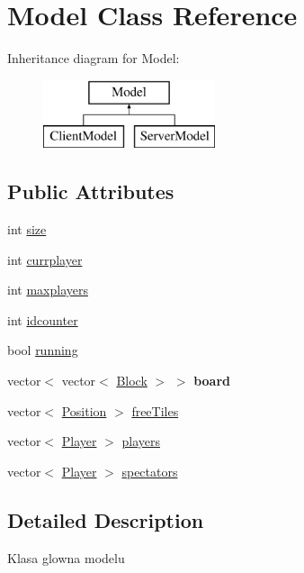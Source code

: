 \hypertarget{classModel}{\section{Model Class Reference}
\label{classModel}
}
Inheritance diagram for Model\-:\begin{figure}[H]
\begin{center}
\leavevmode
\includegraphics[height=2.000000cm]{classModel}
\end{center}
\end{figure}
\subsection*{Public Attributes}
\begin{DoxyCompactItemize}
\item 
int \hyperlink{classModel_a944736812928acb65055f5c7229970ae}{size}
\item 
int \hyperlink{classModel_a882710d0512c34c6b9b385c8d76825cb}{currplayer}
\item 
int \hyperlink{classModel_aa90bb7e95e18111d59df116fcabbdd89}{maxplayers}
\item 
int \hyperlink{classModel_addac0dda85cc75450345d300c48ff276}{idcounter}
\item 
bool \hyperlink{classModel_a46db7d7d8e79bf0bebd19c3e0122fba0}{running}
\item 
\hypertarget{classModel_a9e938f44d01e9e872152b1cad3f81646}{vector$<$ vector$<$ \hyperlink{classBlock}{Block} $>$ $>$ {\bfseries board}}\label{classModel_a9e938f44d01e9e872152b1cad3f81646}

\item 
vector$<$ \hyperlink{classPosition}{Position} $>$ \hyperlink{classModel_a082090abc6b22e3bb5354f892417c444}{free\-Tiles}
\item 
vector$<$ \hyperlink{classPlayer}{Player} $>$ \hyperlink{classModel_ae426f6b24893143e51e626a3026938ec}{players}
\item 
vector$<$ \hyperlink{classPlayer}{Player} $>$ \hyperlink{classModel_a268ae9f01416e04638a2424ee0e457ac}{spectators}
\end{DoxyCompactItemize}


\subsection{Detailed Description}
Klasa glowna modelu 

